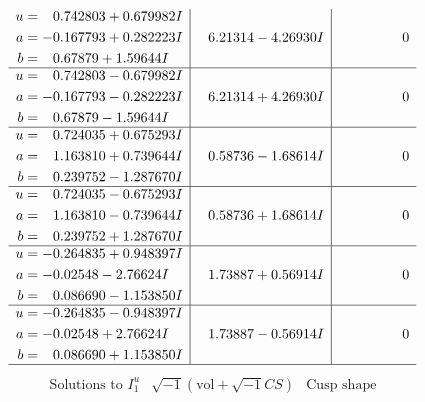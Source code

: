 \documentclass[1p]{elsarticle_modified}
\theoremstyle{definition}
\newcommand{\I}{\sqrt{-1}}
\begin{document}
$$\begin{array}{c|c|c}
\begin{aligned}
u &= \phantom{-}0.742803 + 0.679982 I \\
a &= -0.167793 + 0.282223 I \\
b &= \phantom{-}0.67879 + 1.59644 I\end{aligned}
 & \phantom{-}6.21314 - 4.26930 I & \phantom{-0.000000 } 0 \\ \hline\begin{aligned}
u &= \phantom{-}0.742803 - 0.679982 I \\
a &= -0.167793 - 0.282223 I \\
b &= \phantom{-}0.67879 - 1.59644 I\end{aligned}
 & \phantom{-}6.21314 + 4.26930 I & \phantom{-0.000000 } 0 \\ \hline\begin{aligned}
u &= \phantom{-}0.724035 + 0.675293 I \\
a &= \phantom{-}1.163810 + 0.739644 I \\
b &= \phantom{-}0.239752 - 1.287670 I\end{aligned}
 & \phantom{-}0.58736 - 1.68614 I & \phantom{-0.000000 } 0 \\ \hline\begin{aligned}
u &= \phantom{-}0.724035 - 0.675293 I \\
a &= \phantom{-}1.163810 - 0.739644 I \\
b &= \phantom{-}0.239752 + 1.287670 I\end{aligned}
 & \phantom{-}0.58736 + 1.68614 I & \phantom{-0.000000 } 0 \\ \hline\begin{aligned}
u &= -0.264835 + 0.948397 I \\
a &= -0.02548 - 2.76624 I \\
b &= \phantom{-}0.086690 - 1.153850 I\end{aligned}
 & \phantom{-}1.73887 + 0.56914 I & \phantom{-0.000000 } 0 \\ \hline\begin{aligned}
u &= -0.264835 - 0.948397 I \\
a &= -0.02548 + 2.76624 I \\
b &= \phantom{-}0.086690 + 1.153850 I\end{aligned}
 & \phantom{-}1.73887 - 0.56914 I & \phantom{-0.000000 } 0\\
 \hline 
 \end{array}$$\newpage$$\begin{array}{c|c|c}  
\text{Solutions to }I^u_{1}& \I (\text{vol} + \sqrt{-1}CS) & \text{Cusp shape}\\

\end{array}$$
\end{document}
